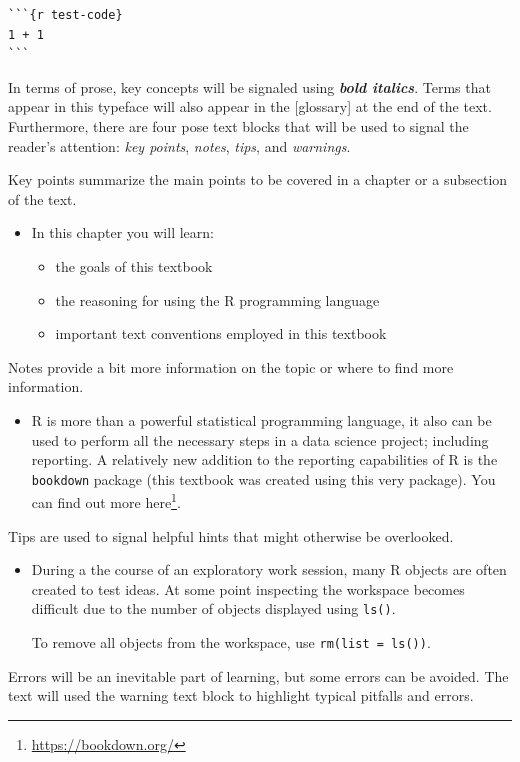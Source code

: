 \documentclass[
]{article}
\DeclareRobustCommand{\href}[2]{#2\footnote{\url{#1}}}
\providecommand{\tightlist}{%
  \setlength{\itemsep}{0pt}\setlength{\parskip}{0pt}}
\newenvironment{rmdblock}[1]
  {\begin{shaded*}
  \begin{itemize}
  \renewcommand{\labelitemi}{
    \raisebox{-.5\height}[0pt][0pt]{
      {\setkeys{Gin}{width=2em,keepaspectratio}\texttt{[image: assets/images/\#1]}}
    }
  }
  \item
  }
  {
  \end{itemize}
  \end{shaded*}
  }
\newenvironment{rmdkey}
  {\begin{rmdblock}{key}}
  {\end{rmdblock}}
\newenvironment{rmdnote}
  {\begin{rmdblock}{note}}
  {\end{rmdblock}}
\newenvironment{rmdtip}
  {\begin{rmdblock}{tip}}
  {\end{rmdblock}}
\begin{document}
\begin{verbatim}
```{r test-code}
1 + 1
```
\end{verbatim}

In terms of prose, key concepts will be signaled using \textbf{\emph{bold italics}}. Terms that appear in this typeface will also appear in the {[}glossary{]} at the end of the text. Furthermore, there are four pose text blocks that will be used to signal the reader's attention: \emph{key points}, \emph{notes}, \emph{tips}, and \emph{warnings}.

Key points summarize the main points to be covered in a chapter or a subsection of the text.

\begin{rmdkey}
In this chapter you will learn:

\begin{itemize}
\tightlist
\item
  the goals of this textbook
\item
  the reasoning for using the R programming language
\item
  important text conventions employed in this textbook
\end{itemize}
\end{rmdkey}

Notes provide a bit more information on the topic or where to find more information.

\begin{rmdnote}
R is more than a powerful statistical programming language, it also can
be used to perform all the necessary steps in a data science project;
including reporting. A relatively new addition to the reporting
capabilities of R is the \texttt{bookdown} package (this textbook was
created using this very package). You can find out more
\href{https://bookdown.org/}{here}.
\end{rmdnote}

Tips are used to signal helpful hints that might otherwise be overlooked.

\begin{rmdtip}
During a the course of an exploratory work session, many R objects are
often created to test ideas. At some point inspecting the workspace
becomes difficult due to the number of objects displayed using
\texttt{ls()}.

To remove all objects from the workspace, use
\texttt{rm(list\ =\ ls())}.
\end{rmdtip}

Errors will be an inevitable part of learning, but some errors can be avoided. The text will used the warning text block to highlight typical pitfalls and errors.
\end{document}

